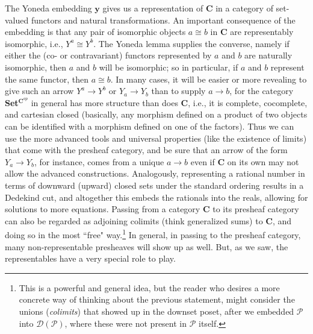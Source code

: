 \documentclass[a4paper]{book}
\theoremstyle{definition}
\theoremstyle{definition}
\theoremstyle{definition}
\theoremstyle{theorem}
\theoremstyle{definition}
\begin{document}
The Yoneda embedding $\textbf{y}$ gives us a representation of \textbf{C} in a category of set-valued functors and natural transformations. An important consequence of the embedding is that any pair of isomorphic objects $a \cong b$ in \textbf{C} are representably isomorphic, i.e., $Y^a \cong Y^b$. The Yoneda lemma supplies the converse, namely if either the (co- or contravariant) functors represented by $a$ and $b$ are naturally isomorphic, then $a$ and $b$ will be isomorphic; so in particular, if $a$ and $b$ represent the same functor, then $a \cong b$. In many cases, it will be easier or more revealing to give such an arrow $Y^a \rightarrow Y^b$ or $Y_a \rightarrow Y_b$ than to supply $a \rightarrow b$, for the category \textbf{Set}$^{\textbf{C}^{op}}$ in general has more structure than does \textbf{C}, i.e., it is complete, cocomplete, and cartesian closed (basically, any morphism defined on a product of two objects can be identified with a morphism defined on one of the factors). Thus we can use the more advanced tools and universal properties (like the existence of limits) that come with the presheaf category, and be sure that an arrow of the form $Y_a \rightarrow Y_b$, for instance, comes from a unique $a \rightarrow b$ even if \textbf{C} on its own may not allow the advanced constructions. Analogously, representing a rational number in terms of downward (upward) closed sets under the standard ordering results in a Dedekind cut, and altogether this embeds the rationals into the reals, allowing for solutions to more equations. Passing from a category \textbf{C} to its presheaf category can also be regarded as adjoining colimits (think generalized sums) to \textbf{C}, and doing so in the most ``free" way.\footnote{This is a powerful and general idea, but the reader who desires a more concrete way of thinking about the previous statement, might consider the unions (\textit{colimits}) that showed up in the downset poset, after we embedded $\mathcal{P}$ into $\mathcal{D}(\mathcal{P})$, where these were not present in $\mathcal{P}$ itself.} In general, in passing to the presheaf category, many non-representable presheaves will show up as well. But, as we saw, the representables have a very special role to play.  
\end{document}
